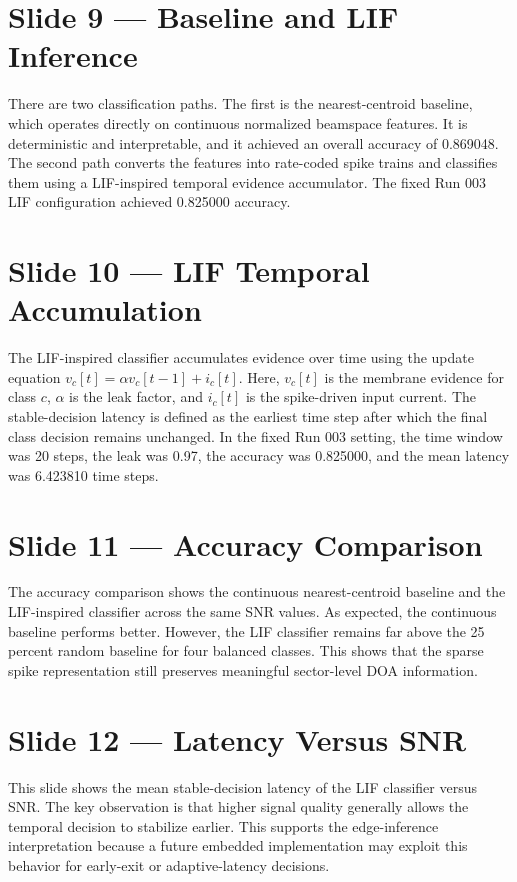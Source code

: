 \documentclass[11pt]{article}
\begin{document}
\section*{Slide 9 --- Baseline and LIF Inference}

There are two classification paths. The first is the nearest-centroid baseline, which operates directly on continuous normalized beamspace features. It is deterministic and interpretable, and it achieved an overall accuracy of 0.869048. The second path converts the features into rate-coded spike trains and classifies them using a LIF-inspired temporal evidence accumulator. The fixed Run 003 LIF configuration achieved 0.825000 accuracy.

\section*{Slide 10 --- LIF Temporal Accumulation}

The LIF-inspired classifier accumulates evidence over time using the update equation $v_c[t]=\alpha v_c[t-1]+i_c[t]$. Here, $v_c[t]$ is the membrane evidence for class $c$, $\alpha$ is the leak factor, and $i_c[t]$ is the spike-driven input current. The stable-decision latency is defined as the earliest time step after which the final class decision remains unchanged. In the fixed Run 003 setting, the time window was 20 steps, the leak was 0.97, the accuracy was 0.825000, and the mean latency was 6.423810 time steps.

\section*{Slide 11 --- Accuracy Comparison}

The accuracy comparison shows the continuous nearest-centroid baseline and the LIF-inspired classifier across the same SNR values. As expected, the continuous baseline performs better. However, the LIF classifier remains far above the 25 percent random baseline for four balanced classes. This shows that the sparse spike representation still preserves meaningful sector-level DOA information.

\section*{Slide 12 --- Latency Versus SNR}

This slide shows the mean stable-decision latency of the LIF classifier versus SNR. The key observation is that higher signal quality generally allows the temporal decision to stabilize earlier. This supports the edge-inference interpretation because a future embedded implementation may exploit this behavior for early-exit or adaptive-latency decisions.
\end{document}
